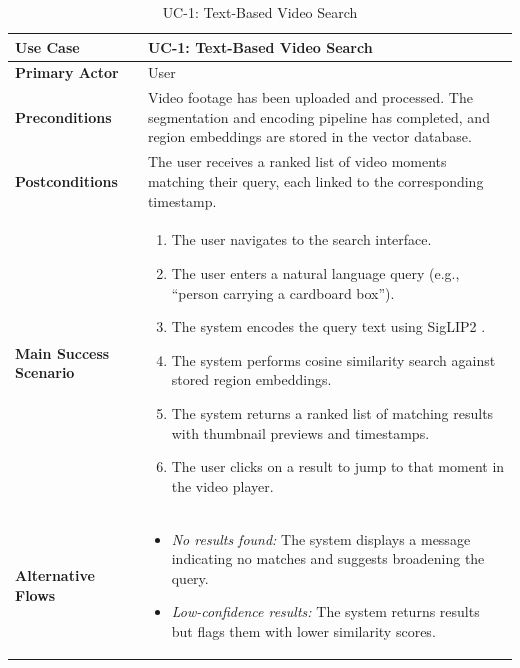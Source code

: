 \begin{table}[H]
\centering
\begin{tabular}{|l|p{10cm}|}
\hline
\textbf{Use Case}       & UC-1: Text-Based Video Search \\ \hline
\textbf{Primary Actor}   & User \\ \hline
\textbf{Preconditions}   & Video footage has been uploaded and processed. The segmentation and encoding pipeline has completed, and region embeddings are stored in the vector database. \\ \hline
\textbf{Postconditions}  & The user receives a ranked list of video moments matching their query, each linked to the corresponding timestamp. \\ \hline
\textbf{Main Success Scenario} &
    \begin{enumerate}[nosep, leftmargin=*]
        \item The user navigates to the search interface.
        \item The user enters a natural language query (e.g., ``person carrying a cardboard box'').
        \item The system encodes the query text using SigLIP2 \cite{zhai2025siglip2}.
        \item The system performs cosine similarity search against stored region embeddings.
        \item The system returns a ranked list of matching results with thumbnail previews and timestamps.
        \item The user clicks on a result to jump to that moment in the video player.
    \end{enumerate} \\ \hline
\textbf{Alternative Flows} &
    \begin{itemize}[nosep, leftmargin=*]
        \item \textit{No results found:} The system displays a message indicating no matches and suggests broadening the query.
        \item \textit{Low-confidence results:} The system returns results but flags them with lower similarity scores.
    \end{itemize} \\ \hline
\end{tabular}
\caption{UC-1: Text-Based Video Search}
\label{tab:uc1}
\end{table}

